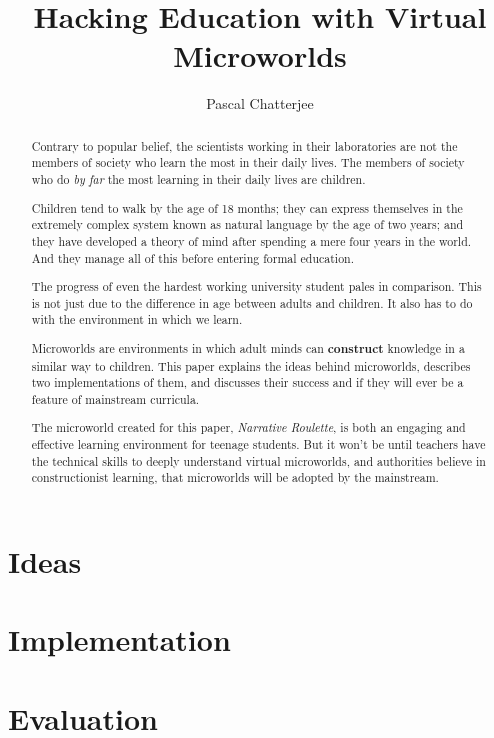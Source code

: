 \documentclass[a4paper]{report}
\title{Hacking Education with Virtual Microworlds}
\author{Pascal Chatterjee}
\begin{document}
\maketitle

\begin{abstract}
Contrary to popular belief, the scientists working in their laboratories are not the members of society who learn the most in their daily lives. The members of society who do \textit{by far} the most learning in their daily lives are children. 

Children tend to walk by the age of 18 months; they can express themselves in the extremely complex system known as natural language by the age of two years; and they have developed a theory of mind after spending a mere four years in the world. And they manage all of this before entering formal education.

The progress of even the hardest working university student pales in comparison. This is not just due to the difference in age between adults and children. It also has to do with the environment in which we learn.

Microworlds are environments in which adult minds can \textbf{construct} knowledge in a similar way to children. This paper explains the ideas behind microworlds, describes two implementations of them, and discusses their success and if they will ever be a feature of mainstream curricula. 

The microworld created for this paper, \textit{Narrative Roulette}, is both an engaging and effective learning environment for teenage students. But it won't be until teachers have the technical skills to deeply understand virtual microworlds, and authorities believe in constructionist learning, that microworlds will be adopted by the mainstream.
\end{abstract}

\tableofcontents

\chapter{Ideas}







\chapter{Implementation}





\chapter{Evaluation}







\end{document}
